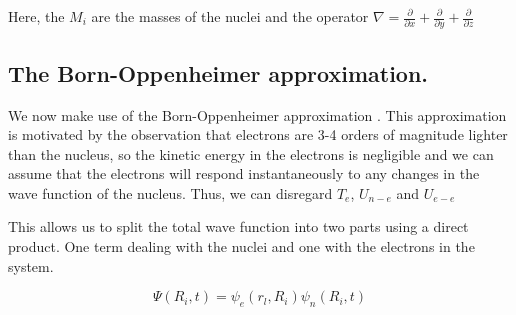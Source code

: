 Here, the $M_i$ are the masses of the nuclei and the operator $\nabla = \frac{\partial}{\partial x} + \frac{\partial }{\partial y} + \frac{\partial}{\partial z} $


\subsection{The Born-Oppenheimer approximation.}
We now make use of the Born-Oppenheimer approximation \cite{Born1927}. This approximation is motivated by the observation that electrons are 3-4 orders of magnitude lighter than the nucleus, so the kinetic energy in the electrons is negligible and we can assume that the electrons will respond instantaneously to any changes in the wave function of the nucleus. Thus, we can disregard $T_e$, $U_{n-e}$ and $U_{e-e}$

This allows us to split the total wave function into two parts using a direct product. One term dealing with the nuclei and one with the electrons in the system. 

\begin {equation}
\Psi(R_i,t) = \psi_e (r_l,R_i) \psi_n(R_i,t)
\end {equation}


